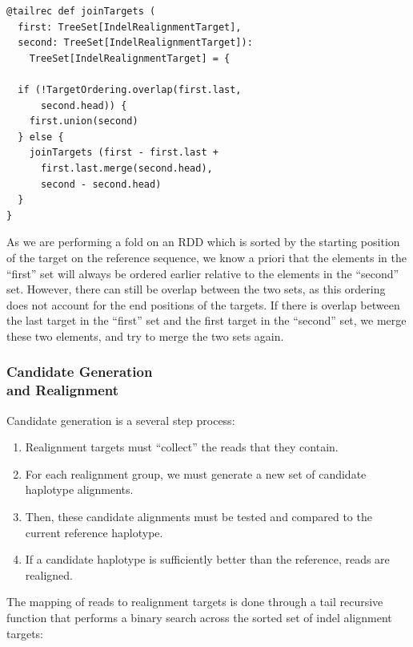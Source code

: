 \documentclass{acm_proc_article-sp}
\begin{document}
\begin{lstlisting}
@tailrec def joinTargets (                                                                                                                                                               
  first: TreeSet[IndelRealignmentTarget],                                                                                                                                                                
  second: TreeSet[IndelRealignmentTarget]):
    TreeSet[IndelRealignmentTarget] = {

  if (!TargetOrdering.overlap(first.last,
      second.head)) {
    first.union(second)
  } else {
    joinTargets (first - first.last +
      first.last.merge(second.head),
      second - second.head)
  }
}
\end{lstlisting}

As we are performing a fold on an RDD which is sorted by the starting position of the target on the reference sequence, we know a priori that the elements
in the ``first'' set will always be ordered earlier relative to the elements in the ``second'' set. However, there can still be overlap between the two sets, as this
ordering does not account for the end positions of the targets. If there is overlap between the last target in the ``first'' set and the first target in the ``second''
set, we merge these two elements, and try to merge the two sets again.

\subsubsection{Candidate Generation\\and Realignment}
\label{sec:candidate-generation-realignment}

Candidate generation is a several step process:

\begin{enumerate}
\item Realignment targets must ``collect'' the reads that they contain.
\item For each realignment group, we must generate a new set of candidate haplotype alignments.
\item Then, these candidate alignments must be tested and compared to the current reference haplotype.
\item If a candidate haplotype is sufficiently better than the reference, reads are realigned.
\end{enumerate}

The mapping of reads to realignment targets is done through a tail recursive function that performs a binary search across the sorted set of indel alignment targets:
\end{document}
